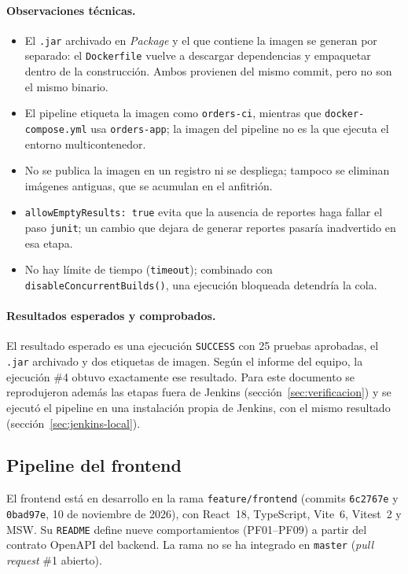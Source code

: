 \documentclass[11pt,a4paper]{article}
\begin{document}
\paragraph{Observaciones técnicas.}
\begin{itemize}[noitemsep]
  \item El \texttt{.jar} archivado en \emph{Package} y el que contiene la imagen se generan por
        separado: el \texttt{Dockerfile} vuelve a descargar dependencias y empaquetar dentro de la
        construcción. Ambos provienen del mismo commit, pero no son el mismo binario.
  \item El pipeline etiqueta la imagen como \texttt{orders-ci}, mientras que
        \texttt{docker-compose.yml} usa \texttt{orders-app}; la imagen del pipeline no es la que
        ejecuta el entorno multicontenedor.
  \item No se publica la imagen en un registro ni se despliega; tampoco se eliminan imágenes
        antiguas, que se acumulan en el anfitrión.
  \item \texttt{allowEmptyResults: true} evita que la ausencia de reportes haga fallar el paso
        \texttt{junit}; un cambio que dejara de generar reportes pasaría inadvertido en esa etapa.
  \item No hay límite de tiempo (\texttt{timeout}); combinado con \texttt{disableConcurrentBuilds()},
        una ejecución bloqueada detendría la cola.
\end{itemize}

\paragraph{Resultados esperados y comprobados.} El resultado esperado es una ejecución
\texttt{SUCCESS} con 25 pruebas aprobadas, el \texttt{.jar} archivado y dos etiquetas de imagen. Según
el informe del equipo, la ejecución \#4 obtuvo exactamente ese resultado. Para este documento se
reprodujeron además las etapas fuera de Jenkins (sección~\ref{sec:verificacion}) y se ejecutó el
pipeline en una instalación propia de Jenkins, con el mismo resultado (sección~\ref{sec:jenkins-local}).

\subsection{Pipeline del frontend}
\label{sec:pipeline-front}

El frontend está en desarrollo en la rama \texttt{feature/frontend} (commits \texttt{6c2767e} y
\texttt{0bad97e}, 10 de noviembre de 2026), con React~18, TypeScript, Vite~6, Vitest~2 y MSW. Su
\texttt{README} define nueve comportamientos (PF01--PF09) a partir del contrato OpenAPI del backend.
La rama no se ha integrado en \texttt{master} (\emph{pull request} \#1 abierto).
\end{document}
